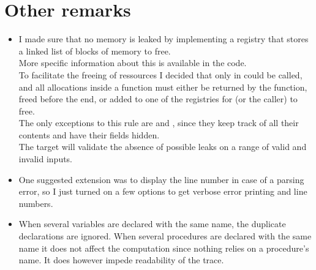 \section{Other remarks}

\begin{itemize}
    \item I made sure that no memory is leaked by implementing a registry
        that stores a linked list of blocks of memory to free.\\
        More specific information about this is available in the code.\\

        To facilitate the freeing of ressources I decided that only in
         could  be called, and all allocations inside
        a function must either be returned by the function, freed before
        the end, or added to one of the registries for  (or the caller) to free.\\
        The only exceptions to this rule are  and ,
        since they keep track of all their contents and have their fields hidden.\\

        The  target will validate the absence of
        possible leaks on a range of valid and invalid inputs.\\

    \item One suggested extension was to display the line number in case
        of a parsing error, so I just turned on a few options to get
        verbose error printing and line numbers.\\

    \item When several variables are declared with the same name, the
        duplicate declarations are ignored. When several procedures are
        declared with the same name it does not affect the computation
        since nothing relies on a procedure's name. It does however impede
        readability of the trace.
\end{itemize}
